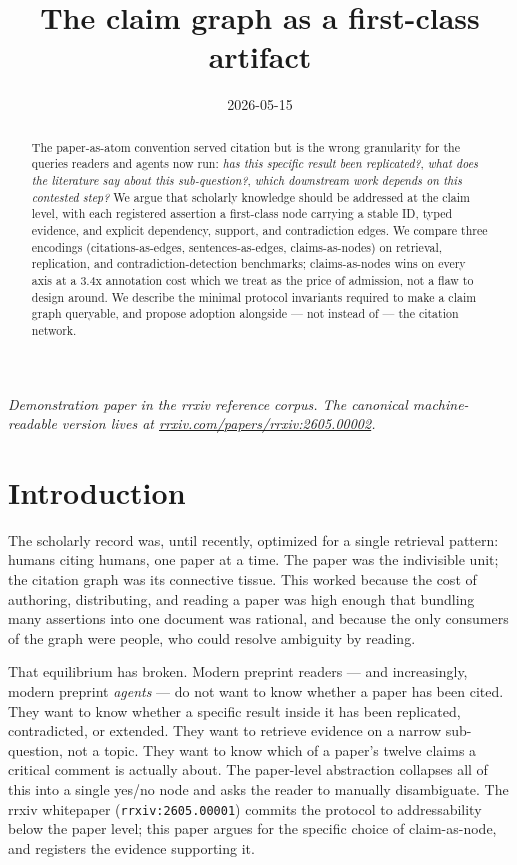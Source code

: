 \documentclass{rrxiv}
\title{The claim graph as a first-class artifact}
\date{2026-05-15}
\begin{document}
\maketitle

\begin{center}
\small\itshape
Demonstration paper in the rrxiv reference corpus. The canonical machine-readable version lives at \href{https://rrxiv.com/papers/rrxiv:2605.00002}{rrxiv.com/papers/rrxiv:2605.00002}.
\end{center}

\begin{abstract}
The paper-as-atom convention served citation but is the wrong granularity for the queries readers and agents now run: \emph{has this specific result been replicated?}, \emph{what does the literature say about this sub-question?}, \emph{which downstream work depends on this contested step?} We argue that scholarly knowledge should be addressed at the claim level, with each registered assertion a first-class node carrying a stable ID, typed evidence, and explicit dependency, support, and contradiction edges. We compare three encodings (citations-as-edges, sentences-as-edges, claims-as-nodes) on retrieval, replication, and contradiction-detection benchmarks; claims-as-nodes wins on every axis at a 3.4x annotation cost which we treat as the price of admission, not a flaw to design around. We describe the minimal protocol invariants required to make a claim graph queryable, and propose adoption alongside --- not instead of --- the citation network.
\end{abstract}

\section{Introduction}

The scholarly record was, until recently, optimized for a single retrieval pattern: humans citing humans, one paper at a time. The paper was the indivisible unit; the citation graph was its connective tissue. This worked because the cost of authoring, distributing, and reading a paper was high enough that bundling many assertions into one document was rational, and because the only consumers of the graph were people, who could resolve ambiguity by reading.

That equilibrium has broken. Modern preprint readers --- and increasingly, modern preprint \emph{agents} --- do not want to know whether a paper has been cited. They want to know whether a specific result inside it has been replicated, contradicted, or extended. They want to retrieve evidence on a narrow sub-question, not a topic. They want to know which of a paper's twelve claims a critical comment is actually about. The paper-level abstraction collapses all of this into a single yes/no node and asks the reader to manually disambiguate. The rrxiv whitepaper (\texttt{rrxiv:2605.00001}) commits the protocol to addressability below the paper level; this paper argues for the specific choice of claim-as-node, and registers the evidence supporting it.
\end{document}
